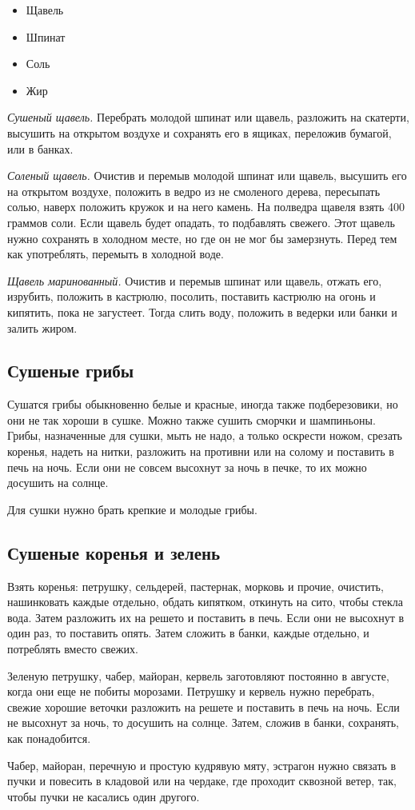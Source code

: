 \begin{itemize}
	\item Щавель
    \item Шпинат
    \item Соль
    \item Жир
\end{itemize}

\emph{Сушеный щавель.} Перебрать молодой шпинат или щавель, разложить на скатерти, высушить на открытом воздухе и сохранять его в ящиках, переложив бумагой, или в банках.

\emph{Соленый щавель.} Очистив и перемыв молодой шпинат или щавель, высушить его на открытом воздухе, положить в ведро из не смоленого дерева, пересыпать солью, наверх положить кружок и на него камень. На полведра щавеля взять 400 граммов соли. Если щавель будет опадать, то подбавлять свежего. Этот щавель нужно сохранять в холодном месте, но где он не мог бы замерзнуть. Перед тем как употреблять, перемыть в холодной воде.

\emph{Щавель маринованный.} Очистив и перемыв шпинат или щавель, отжать его, изрубить, положить в кастрюлю, посолить, поставить кастрюлю на огонь и кипятить, пока не загустеет. Тогда слить воду, положить в ведерки или банки и залить жиром.

\subsection{Сушеные грибы}

Сушатся грибы обыкновенно белые и красные, иногда также подберезовики, но они не так хороши в сушке. Можно также сушить сморчки и шампиньоны. Грибы, назначенные для сушки, мыть не надо, а только оскрести ножом, срезать коренья, надеть на нитки, разложить на противни или на солому и поставить в печь на ночь. Если они не совсем высохнут за ночь в печке, то их можно досушить на солнце.

Для сушки нужно брать крепкие и молодые грибы.

\subsection{Сушеные коренья и зелень}

Взять коренья: петрушку, сельдерей, пастернак, морковь и прочие, очистить, нашинковать каждые отдельно, обдать кипятком, откинуть на сито, чтобы стекла вода. Затем разложить их на решето и поставить в печь. Если они не высохнут в один раз, то поставить опять. Затем сложить в банки, каждые отдельно, и потреблять вместо свежих.

Зеленую петрушку, чабер, майоран, кервель заготовляют постоянно в августе, когда они еще не побиты морозами. Петрушку и кервель нужно перебрать, свежие хорошие веточки разложить на решете и поставить в печь на ночь. Если не высохнут за ночь, то досушить на солнце. Затем, сложив в банки, сохранять, как понадобится.

Чабер, майоран, перечную и простую кудрявую мяту, эстрагон нужно связать в пучки и повесить в кладовой или на чердаке, где проходит сквозной ветер, так, чтобы пучки не касались один другого.